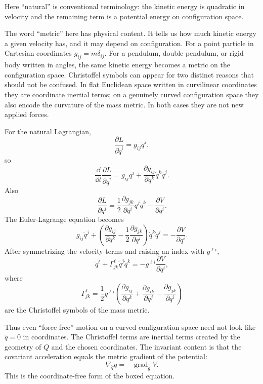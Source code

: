 \begin{remark}[Terminology]
Here ``natural'' is conventional terminology: the kinetic energy is quadratic
in velocity and the remaining term is a potential energy on configuration
space.
\end{remark}

The word ``metric'' here has physical content. It tells us how much kinetic
energy a given velocity has, and it may depend on configuration. For a point
particle in Cartesian coordinates \(g_{ij}=m\delta_{ij}\). For a
pendulum, double pendulum, or rigid body written in angles, the same kinetic
energy becomes a metric on the configuration space. Christoffel symbols can
appear for two distinct reasons that should not be confused. In flat Euclidean
space written in curvilinear coordinates they are coordinate inertial terms; on
a genuinely curved configuration space they also encode the curvature of the
mass metric. In both cases they are not new applied forces.

\begin{derivation}
For the natural Lagrangian,
\[
  \frac{\partial L}{\partial \dot q^i}=g_{ij}\dot q^j,
\]
so
\[
  \frac{\dd}{\dd t}\frac{\partial L}{\partial \dot q^i}
  =
  g_{ij}\ddot q^j
  +
  \frac{\partial g_{ij}}{\partial q^k}\dot q^k\dot q^j.
\]
Also
\[
  \frac{\partial L}{\partial q^i}
  =
  \frac{1}{2}\frac{\partial g_{jk}}{\partial q^i}\dot q^j\dot q^k
  -
  \frac{\partial V}{\partial q^i}.
\]
The Euler-Lagrange equation becomes
\[
  g_{ij}\ddot q^j
  +
  \left(
    \frac{\partial g_{ij}}{\partial q^k}
    -
    \frac{1}{2}\frac{\partial g_{jk}}{\partial q^i}
  \right)\dot q^k\dot q^j
  =
  -\frac{\partial V}{\partial q^i}.
\]
After symmetrizing the velocity terms and raising an index with \(g^{\ell i}\),
\[
  \boxed{
  \ddot q^\ell+\Gamma^\ell_{jk}\dot q^j\dot q^k
  =
  -g^{\ell i}\frac{\partial V}{\partial q^i}
  },
\]
where
\[
  \Gamma^\ell_{jk}
  =
  \frac{1}{2}g^{\ell i}
  \left(
    \frac{\partial g_{ij}}{\partial q^k}
    +
    \frac{\partial g_{ik}}{\partial q^j}
    -
    \frac{\partial g_{jk}}{\partial q^i}
  \right)
\]
are the Christoffel symbols of the mass metric.
\end{derivation}

Thus even ``force-free'' motion on a curved configuration space need not look
like \(\ddot q=0\) in coordinates. The Christoffel terms are inertial terms
created by the geometry of \(Q\) and the chosen coordinates. The invariant
content is that the covariant acceleration equals the metric gradient of the
potential:
\[
  \nabla_{\dot q}\dot q=-\operatorname{grad}_g V.
\]
This is the coordinate-free form of the boxed equation.

